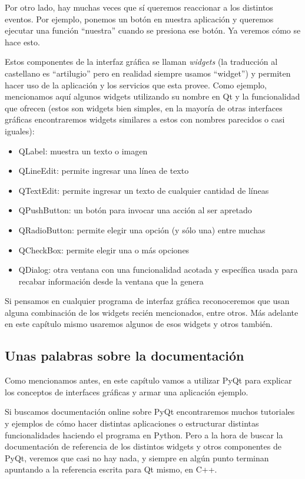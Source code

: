 Por otro lado, hay muchas veces que sí queremos reaccionar a los distintos eventos. Por ejemplo, ponemos un botón en nuestra aplicación y queremos ejecutar una función ``nuestra'' cuando se presiona ese botón. Ya veremos cómo se hace esto.

Estos componentes de la interfaz gráfica se llaman \textit{widgets} (la traducción al castellano es ``artilugio'' pero en realidad siempre usamos ``widget'') y permiten hacer uso de la aplicación y los servicios que esta provee. Como ejemplo, mencionamos aquí algunos widgets utilizando su nombre en Qt y la funcionalidad que ofrecen (estos son widgets bien simples, en la mayoría de otras interfaces gráficas encontraremos widgets similares a estos con nombres parecidos o casi iguales):

\begin{itemize}
\item QLabel: muestra un texto o imagen
\item QLineEdit: permite ingresar una línea de texto
\item QTextEdit: permite ingresar un texto de cualquier cantidad de líneas
\item QPushButton: un botón para invocar una acción al ser apretado
\item QRadioButton: permite elegir una opción (y sólo una) entre muchas
\item QCheckBox: permite elegir una o más opciones
\item QDialog: otra ventana con una funcionalidad acotada y específica usada para recabar información desde la ventana que la genera
\end{itemize}

Si pensamos en cualquier programa de interfaz gráfica reconoceremos que usan alguna combinación de los widgets recién mencionados, entre otros. Más adelante en este capítulo mismo usaremos algunos de esos widgets y otros también.


\subsection{Unas palabras sobre la documentación}

Como mencionamos antes, en este capítulo vamos a utilizar PyQt para explicar los conceptos de interfaces gráficas y armar una aplicación ejemplo.

Si buscamos documentación online sobre PyQt encontraremos muchos tutoriales y ejemplos de cómo hacer distintas aplicaciones o estructurar distintas funcionalidades haciendo el programa en Python. Pero a la hora de buscar la documentación de referencia de los distintos widgets y otros componentes de PyQt, veremos que casi no hay nada, y siempre en algún punto terminan apuntando a la referencia escrita para Qt mismo, en C++.

